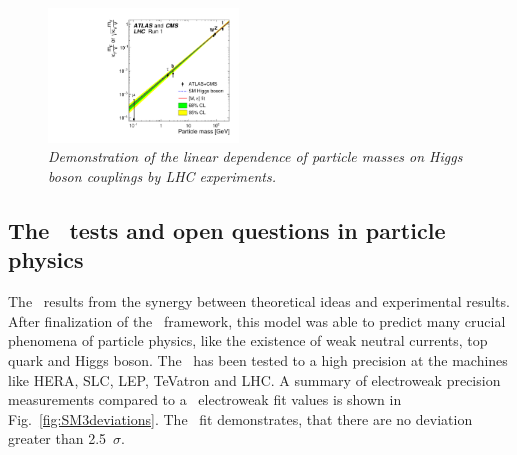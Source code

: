 \begin{figure}
{\centering
    \includegraphics[width=0.45\textwidth]{graphics/Meps_lhc.pdf}
    \caption{\sl Demonstration of the linear dependence of particle masses on Higgs boson couplings by LHC experiments. \cite{bib:HiggsLhc2}}
    \label{fig:higgs_masses}
  }
\end{figure}

\subsection{The \sm\ tests and open questions in particle physics}
\label{sec:Problems_SM}
The \sm\ results from the synergy between theoretical ideas and experimental results. After finalization of the \sm\ framework, this model was able to predict many crucial phenomena of particle physics, like the existence of weak neutral currents, top quark and Higgs boson.
The \sm\ has been tested to a high precision at the machines like HERA, SLC, LEP, TeVatron and LHC. A summary of electroweak precision measurements compared to a \sm\ electroweak fit values is shown in Fig.~\ref{fig:SM3deviations}. The \sm\ fit demonstrates, that there are no deviation greater than 2.5~$\sigma$. 

